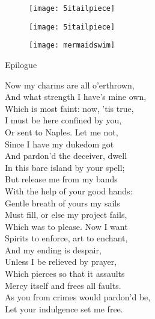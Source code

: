 \exeunt{}

\begin{letter}
	\begin{figure}[b!]
		\centering
		\texttt{[image: 5itailpiece]}
	\end{figure}
\end{letter}
\begin{a4}
	\begin{figure}[b!]
		\centering
		\texttt{[image: 5itailpiece]}
	\end{figure}
\end{a4}


\cleardoubleoddpage


\begin{figure}[t]
	\centering
	\texttt{[image: mermaidswim]}
\end{figure}
	


\begin{center}\Large\chapterfont
Epilogue
\end{center}

\begin{verse_speech}[Prospero] 
Now my charms are all o'erthrown,\\
And what strength I have's mine own,\\
Which is most faint: now, 'tis true,\\
I must be here confined by you,\\
Or sent to Naples. Let me not,\\
Since I have my dukedom got\\
And pardon'd the deceiver, dwell\\
In this bare island by your spell;\\
But release me from my bands\\
With the help of your good hands:\\
Gentle breath of yours my sails\\
Must fill, or else my project fails,\\
Which was to please. Now I want\\
Spirits to enforce, art to enchant,\\
And my ending is despair,\\
Unless I be relieved by prayer,\\
Which pierces so that it assaults\\
Mercy itself and frees all faults.\\
As you from crimes would pardon'd be,\\
Let your indulgence set me free.
\end{verse_speech}
